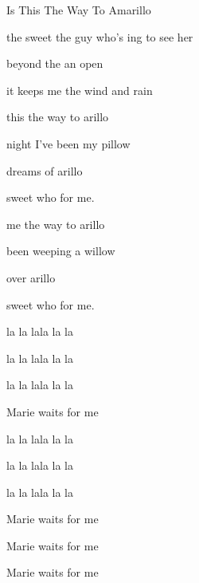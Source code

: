 \begin{SBSong}{Is This The Way To Amarillo}
\begin{SBVerse}
     the sweet    the guy who's ing to see her
    
     beyond the   an open 
    
     it keeps me    the wind and rain
  \end{SBVerse} 
  \CBPageBrk
  \begin{SBChorus}
     this the way to arillo 
    
     night I've been  my pillow 
    
     dreams of arillo 
    
     sweet  who  for me.
    
     me the way to arillo 
    
     been weeping  a willow 
    
     over arillo 
    
     sweet  who  for me.
  \end {SBChorus}
  \begin{SBVerse}
     la la lala la la  
    
     la la lala la la  
     
     la la lala la la 
    
     Marie  waits for me
    
     la la lala la la  
    
     la la lala la la  
     
     la la lala la la 
    
     Marie  waits for me
    
     Marie  waits for me
    
     Marie  waits for me  
  \end{SBVerse}
\end{SBSong}
